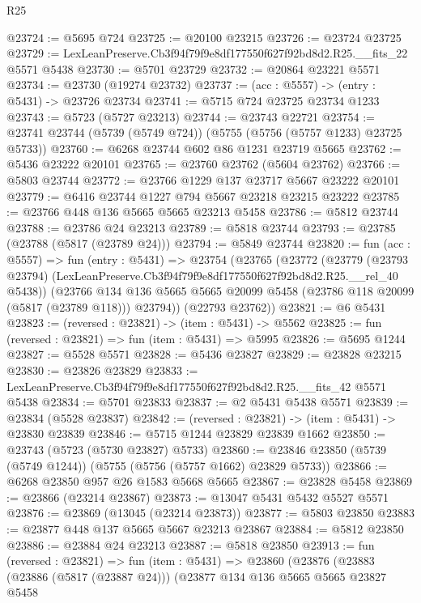 \begin{lexlean}{R25}
\begin{coremodule}
@23724 := @5695 @724
@23725 := @20100 @23215
@23726 := @23724 @23725
@23729 := LexLeanPreserve.Cb3f94f79f9e8df177550f627f92bd8d2.R25.__fits_22 @5571 @5438
@23730 := @5701 @23729
@23732 := @20864 @23221 @5571
@23734 := @23730 (@19274 @23732)
@23737 := (acc : @5557) -> (entry : @5431) -> @23726 @23734
@23741 := @5715 @724 @23725 @23734 @1233
@23743 := @5723 (@5727 @23213)
@23744 := @23743 @22721
@23754 := @23741 @23744 (@5739 (@5749 @724)) (@5755 (@5756 (@5757 @1233) @23725 @5733))
@23760 := @6268 @23744 @602 @86 @1231 @23719 @5665
@23762 := @5436 @23222 @20101
@23765 := @23760 @23762 (@5604 @23762)
@23766 := @5803 @23744
@23772 := @23766 @1229 @137 @23717 @5667 @23222 @20101
@23779 := @6416 @23744 @1227 @794 @5667 @23218 @23215 @23222
@23785 := @23766 @448 @136 @5665 @5665 @23213 @5458
@23786 := @5812 @23744
@23788 := @23786 @24 @23213
@23789 := @5818 @23744
@23793 := @23785 (@23788 (@5817 (@23789 @24)))
@23794 := @5849 @23744
@23820 := fun (acc : @5557) =>
  fun (entry : @5431) =>
  @23754
    (@23765
      (@23772
        (@23779
          (@23793 @23794)
          (LexLeanPreserve.Cb3f94f79f9e8df177550f627f92bd8d2.R25.__rel_40 @5438))
        (@23766
          @134
          @136
          @5665
          @5665
          @20099
          @5458
          (@23786 @118 @20099 (@5817 (@23789 @118)))
          @23794))
      (@22793 @23762))
@23821 := @6 @5431
@23823 := (reversed : @23821) -> (item : @5431) -> @5562
@23825 := fun (reversed : @23821) => fun (item : @5431) => @5995
@23826 := @5695 @1244
@23827 := @5528 @5571
@23828 := @5436 @23827
@23829 := @23828 @23215
@23830 := @23826 @23829
@23833 := LexLeanPreserve.Cb3f94f79f9e8df177550f627f92bd8d2.R25.__fits_42 @5571 @5438
@23834 := @5701 @23833
@23837 := @2 @5431 @5438 @5571
@23839 := @23834 (@5528 @23837)
@23842 := (reversed : @23821) -> (item : @5431) -> @23830 @23839
@23846 := @5715 @1244 @23829 @23839 @1662
@23850 := @23743 (@5723 (@5730 @23827) @5733)
@23860 := @23846 @23850 (@5739 (@5749 @1244)) (@5755 (@5756 (@5757 @1662) @23829 @5733))
@23866 := @6268 @23850 @957 @26 @1583 @5668 @5665
@23867 := @23828 @5458
@23869 := @23866 (@23214 @23867)
@23873 := @13047 @5431 @5432 @5527 @5571
@23876 := @23869 (@13045 (@23214 @23873))
@23877 := @5803 @23850
@23883 := @23877 @448 @137 @5665 @5667 @23213 @23867
@23884 := @5812 @23850
@23886 := @23884 @24 @23213
@23887 := @5818 @23850
@23913 := fun (reversed : @23821) =>
  fun (item : @5431) =>
  @23860
    (@23876
      (@23883
        (@23886 (@5817 (@23887 @24)))
        (@23877
          @134
          @136
          @5665
          @5665
          @23827
          @5458

\end{coremodule}
\end{lexlean}
